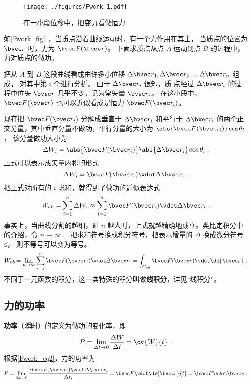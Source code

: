 

\begin{figure}[ht]
\centering
\texttt{[image: ./figures/Fwork\_1.pdf]}
\caption{在一小段位移中，把变力看做恒力}\label{Fwork_fig1}
\end{figure}

如\autoref{Fwork_fig1}，当质点沿着曲线运动时，有一个力作用在其上， 当质点的位置为 $\bvec r$ 时，力为 $\bvec F(\bvec r)$。 下面求质点从点 $A$ 运动到点 $B$ 的过程中，力对质点的做功。

把从 $A$ 到 $B$ 这段曲线看成由许多小位移 $\Delta \bvec r_1, \Delta \bvec r_2 \dots \Delta \bvec r_n$ 组成， 对其中第 $i$ 个进行分析。 由于 $\Delta \bvec r_i$ 很短，质
点经过 $\Delta \bvec r_i$ 的过程中位矢 $\bvec r$ 几乎不变，记为常矢量 $\bvec r_i$。 在这小段中，  $\bvec F(\bvec r)$ 也可以近似看成是恒力 $\bvec F(\bvec r_i)$。 

现在把 $\bvec F(\bvec r_i)$ 分解成垂直于 $\Delta \bvec r_i$ 和平行于 $\Delta \bvec r_i$ 的两个正交分量，其中垂直分量不做功，平行分量的大小为 $ \abs{\bvec F(\bvec r_i)} \cos \theta_i$， 该分量做功大小为
\begin{equation}
\Delta W_i = \abs{\bvec F(\bvec r_i)} \abs{\Delta \bvec r_i} \cos \theta_i~.
\end{equation}
上式可以表示成矢量内积的形式
\begin{equation}\label{Fwork_eq2}
\Delta W_i = \bvec F(\bvec r_i) \vdot \Delta \bvec r_i~.
\end{equation}
把上式对所有的 $i$ 求和，就得到了做功的近似表达式
\begin{equation}
W_{ab} = \sum_{i = 1}^n \Delta W_i  \approx \sum_{i = 1}^n \bvec F(\bvec r_i) \vdot \Delta \bvec r_i ~.
\end{equation} 
事实上，当曲线分割的越细，即 $n$ 越大时，上式就越精确地成立。类比定积分中的介绍，令 $n \to \infty $， 把求和符号换成积分符号，把表示增量的 $\Delta $ 换成微分符号 $\dd{}$， 则不等号可以变为等号。
\begin{equation}\label{Fwork_eq1}
W_{ab} = \lim_{n \to \infty } \sum_{i = 1}^n \bvec F(\bvec r_i) \vdot \Delta \bvec r_i  = \int_{C_{ab}} \bvec F(\bvec r) \vdot \dd{\bvec r}~.
\end{equation} 
不同于一元函数的积分，这一类特殊的积分叫做\textbf{线积分}，详见“线积分”。

\subsection{力的功率}
\textbf{功率}（瞬时）的定义为做功的变化率，即
\begin{equation}
P = \lim_{\Delta t\to 0} \frac{\Delta W}{\Delta t} = \dv{W}{t}~.
\end{equation}
根据\autoref{Fwork_eq2}，力的功率为
\begin{equation}
P = \lim_{\Delta t\to 0} \frac{\bvec F(\bvec r_i)\vdot\Delta\bvec r_i}{\Delta t_i} = \bvec F \vdot\dv{\bvec r}{t} = \bvec F\vdot\bvec v~.
\end{equation}







